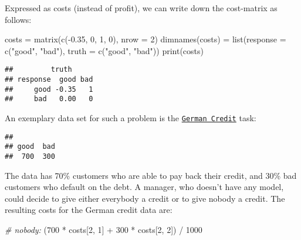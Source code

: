 \documentclass[
]{scrbook}
\newenvironment{Shaded}{\begin{snugshade}}{\end{snugshade}}
\newcommand{\AttributeTok}[1]{\textcolor[rgb]{0.77,0.63,0.00}{#1}}
\newcommand{\CommentTok}[1]{\textcolor[rgb]{0.56,0.35,0.01}{\textit{#1}}}
\newcommand{\DecValTok}[1]{\textcolor[rgb]{0.00,0.00,0.81}{#1}}
\newcommand{\FloatTok}[1]{\textcolor[rgb]{0.00,0.00,0.81}{#1}}
\newcommand{\FunctionTok}[1]{\textcolor[rgb]{0.00,0.00,0.00}{#1}}
\newcommand{\NormalTok}[1]{#1}
\newcommand{\OtherTok}[1]{\textcolor[rgb]{0.56,0.35,0.01}{#1}}
\newcommand{\SpecialCharTok}[1]{\textcolor[rgb]{0.00,0.00,0.00}{#1}}
\newcommand{\StringTok}[1]{\textcolor[rgb]{0.31,0.60,0.02}{#1}}
\renewenvironment{Shaded} {\begin{snugshade}\small} {\end{snugshade}}
\begin{document}
Expressed as costs (instead of profit), we can write down the cost-matrix as follows:

\begin{Shaded}
\begin{Highlighting}[]
\NormalTok{costs }\OtherTok{=} \FunctionTok{matrix}\NormalTok{(}\FunctionTok{c}\NormalTok{(}\SpecialCharTok{{-}}\FloatTok{0.35}\NormalTok{, }\DecValTok{0}\NormalTok{, }\DecValTok{1}\NormalTok{, }\DecValTok{0}\NormalTok{), }\AttributeTok{nrow =} \DecValTok{2}\NormalTok{)}
\FunctionTok{dimnames}\NormalTok{(costs) }\OtherTok{=} \FunctionTok{list}\NormalTok{(}\AttributeTok{response =} \FunctionTok{c}\NormalTok{(}\StringTok{"good"}\NormalTok{, }\StringTok{"bad"}\NormalTok{), }\AttributeTok{truth =} \FunctionTok{c}\NormalTok{(}\StringTok{"good"}\NormalTok{, }\StringTok{"bad"}\NormalTok{))}
\FunctionTok{print}\NormalTok{(costs)}
\end{Highlighting}
\end{Shaded}

\begin{verbatim}
##         truth
## response  good bad
##     good -0.35   1
##     bad   0.00   0
\end{verbatim}

An exemplary data set for such a problem is the \href{https://mlr3.mlr-org.com/reference/mlr_tasks_german_credit.html}{\texttt{German\ Credit}} task:

\begin{Shaded}
\end{Shaded}

\begin{verbatim}
## 
## good  bad 
##  700  300
\end{verbatim}

The data has 70\% customers who are able to pay back their credit, and 30\% bad customers who default on the debt.
A manager, who doesn't have any model, could decide to give either everybody a credit or to give nobody a credit.
The resulting costs for the German credit data are:

\begin{Shaded}
\begin{Highlighting}[]
\CommentTok{\# nobody:}
\NormalTok{(}\DecValTok{700} \SpecialCharTok{*}\NormalTok{ costs[}\DecValTok{2}\NormalTok{, }\DecValTok{1}\NormalTok{] }\SpecialCharTok{+} \DecValTok{300} \SpecialCharTok{*}\NormalTok{ costs[}\DecValTok{2}\NormalTok{, }\DecValTok{2}\NormalTok{]) }\SpecialCharTok{/} \DecValTok{1000}
\end{Highlighting}
\end{Shaded}
\end{document}
